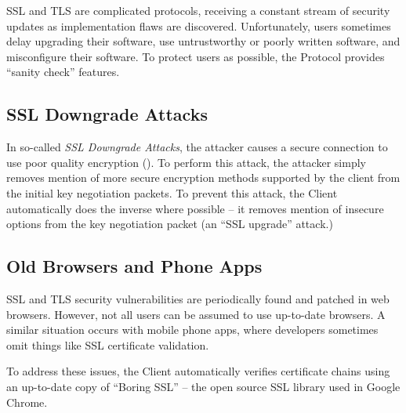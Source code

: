 
SSL and TLS are complicated protocols, receiving a constant stream of
security updates as implementation flaws are discovered.
Unfortunately, users sometimes delay upgrading their software, use
untrustworthy or poorly written software, and misconfigure their
software. To protect users as possible, the \Orchid{} Protocol provides
``sanity check'' features.

\subsection{SSL Downgrade Attacks}

In so-called \emph{SSL Downgrade Attacks}, the attacker causes a
secure connection to use poor quality encryption
(\cite{ssl-downgrade}). To perform this attack, the attacker simply
removes mention of more secure encryption methods supported by the
client from the initial key negotiation packets. To prevent this
attack, the \Orchid{} Client automatically does the inverse where
possible -- it removes mention of insecure options from the key
negotiation packet (an ``SSL upgrade'' attack.)

\subsection{Old Browsers and Phone Apps}

SSL and TLS security vulnerabilities are periodically found and
patched in web browsers. However, not all users can be assumed to use
up-to-date browsers. A similar situation occurs with mobile phone
apps, where developers sometimes omit things like SSL certificate
validation.

To address these issues, the \Orchid{} Client automatically verifies
certificate chains using an up-to-date copy of ``Boring SSL'' -- the
open source SSL library used in Google Chrome.





